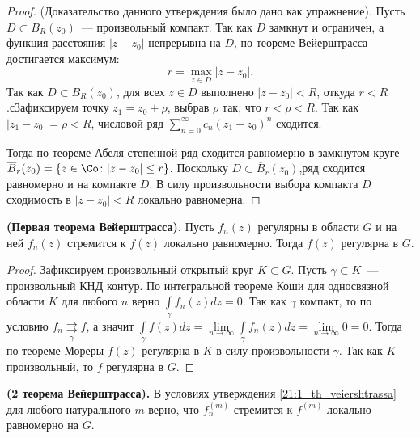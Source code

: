 \begin{proof}
    (Доказательство данного утверждения было дано как упражнение). Пусть \(D \subset B_R(z_0)\)~--- 
    произвольный компакт. Так как \(D\) замкнут и ограничен, а функция расстояния \(|z - z_0|\) 
    непрерывна на \(D\), по теореме Вейерштрасса достигается максимум:
    \[
        r = \max\limits_{z \in D} |z - z_0|.
    \]
    Так как \(D \subset B_R(z_0)\), для всех \(z \in D\) выполнено \(|z - z_0| < R\), откуда 
    \(r < R\).сЗафиксируем точку \(z_1 = z_0 + \rho\), выбрав \(\rho\) так, что \(r < \rho < R\). 
    Так как \(|z_1 - z_0| = \rho < R\), числовой ряд \(\sum\limits_{n=0}^\infty c_n (z_1 - z_0)^n\)
    сходится.

    Тогда по теореме Абеля степенной ряд сходится равномерно в замкнутом круге
    \(\overline{B}_r(z_0) = \{z \in \Co \colon |z - z_0| \le r\}\). Поскольку \(D \subset 
    \overline{B}_r(z_0)\),ряд сходится равномерно и на компакте \(D\). В силу произвольности выбора 
    компакта \(D\) сходимость в \(|z - z_0| < R\) локально равномерна.
\end{proof}

\begin{statement}\label{21:1_th_veiershtrassa}
    \textbf{(Первая теорема Вейерштрасса).} Пусть \(f_n(z)\) регулярны в области \(G\) и на ней 
    \(f_n(z)\) стремится к \(f(z)\) локально равномерно. Тогда \(f(z)\) регулярна в \(G\).
\end{statement}

\begin{proof}
    Зафиксируем произвольный открытый круг \(K \subset G\). Пусть \(\gamma \subset K\)~--- 
    произвольный КНД контур. По интегральной теореме Коши для односвязной области \(K\) для любого
    \(n\) верно \(\int\limits_\gamma f_n(z) dz = 0\). Так как \(\gamma\) компакт, то по условию
    \(f_n \mathrel{\mathop{\rightrightarrows}\limits_{\gamma}} f\), а значит \(\int\limits_\gamma
    f(z) dz = \lim\limits_{n \rightarrow \infty} \int\limits_\gamma f_n(z) dz = 
    \lim\limits_{n \rightarrow \infty} 0 = 0\). Тогда по теореме Мореры \(f(z)\) регулярна в \(K\) в
    силу произвольности \(\gamma\). Так как \(K\)~--- произвольный, то \(f\) регулярна в \(G\).
\end{proof}

\begin{statement}
    \textbf{(2 теорема Вейерштрасса).} В условиях утверждения \ref{21:1_th_veiershtrassa} для
    любого натурального \(m\) верно, что \(f_n^{(m)}\) стремится к \(f^{(m)}\) локально равномерно
    на \(G\).
\end{statement}

